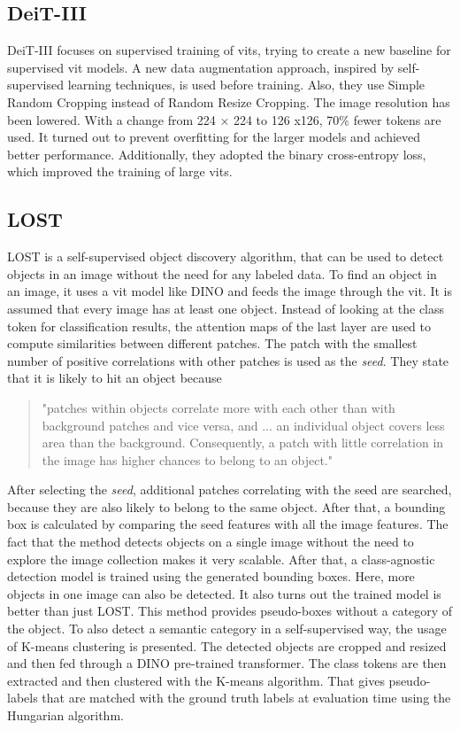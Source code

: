 \documentclass[conference]{IEEEtran}
\begin{document}
  \subsection{\mbox{DeiT-III}}
  \label{sec:deit3}

  \mbox{DeiT-III} focuses on supervised training of \acp{vit}, trying to create a new baseline for supervised \ac{vit} models. A new data augmentation approach, inspired by self-supervised learning techniques, is used before training. Also, they use Simple Random Cropping instead of Random Resize Cropping. The image resolution has been lowered. With a change from 224 × 224 to 126 x126, 70\% fewer tokens are used. It turned out to prevent overfitting for the larger models and achieved better performance. Additionally, they adopted the binary cross-entropy loss, which improved the training of large \acp{vit}. \cite{deit3}

  \subsection{LOST}
  \label{chapter:lost}

  \mbox{LOST} is a self-supervised object discovery algorithm, that can be used to detect objects in an image without the need for any labeled data. To find an object in an image, it uses a \ac{vit} model like \mbox{DINO} and feeds the image through the \ac{vit}. It is assumed that every image has at least one object. Instead of looking at the class token for classification results, the attention maps of the last layer are used to compute similarities between different patches. The patch with the smallest number of positive correlations with other patches is used as the \textit{seed}. They state that it is likely to hit an object because
  \begin{quote}
    "patches within objects correlate more with each other than with background patches and vice versa, and ... an individual object covers less area than the background. Consequently, a patch with little correlation in the image has higher chances to belong to an object." \cite{lost}
  \end{quote}
  After selecting the \textit{seed}, additional patches correlating with the seed are searched, because they are also likely to belong to the same object. After that, a bounding box is calculated by comparing the seed features with all the image features. The fact that the method detects objects on a single image without the need to explore the image collection makes it very scalable. After that, a class-agnostic detection model is trained using the generated bounding boxes. Here, more objects in one image can also be detected. It also turns out the trained model is better than just \mbox{LOST}. This method provides pseudo-boxes without a category of the object. To also detect a semantic category in a self-supervised way, the usage of K-means clustering is presented. The detected objects are cropped and resized and then fed through a \mbox{DINO} pre-trained transformer. The class tokens are then extracted and then clustered with the K-means algorithm. That gives pseudo-labels that are matched with the ground truth labels at evaluation time using the Hungarian algorithm. \cite{lost}
\end{document}
